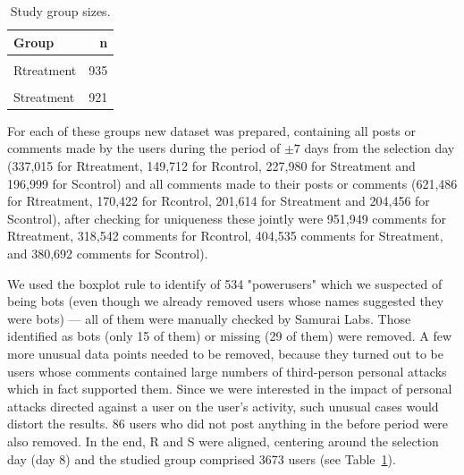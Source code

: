 \documentclass[a4paper,fleqn]{cas-dc}
\begin{document}
\begin{table}[H]

\centering\begingroup\fontsize{9}{11}\selectfont

\begin{tabular}{lr}
\toprule
Group & n\\
\midrule
\cellcolor{gray!6}{Rcontrol} & \cellcolor{gray!6}{875}\\
Rtreatment & 935\\
\cellcolor{gray!6}{Scontrol} & \cellcolor{gray!6}{942}\\
Streatment & 921\\
\bottomrule
\end{tabular}
\endgroup{}
\caption{Study group sizes.}
\label{tab:groups}
\end{table}






For each of these groups new  dataset was prepared, containing all posts or comments made by the users during the period of $\pm 7$ days from the selection day (337,015 for \textsf{Rtreatment}, 149,712 for \textsf{Rcontrol}, 227,980 for \textsf{Streatment} and 196,999 for \textsf{Scontrol}) and all comments made to their posts or comments (621,486 for \textsf{Rtreatment}, 170,422 for \textsf{Rcontrol}, 201,614 for \textsf{Streatment} and 204,456 for \textsf{Scontrol}), after checking for uniqueness these jointly were 951,949 comments for \textsf{Rtreatment}, 318,542 comments for \textsf{Rcontrol}, 404,535 comments for \textsf{Streatment}, and 380,692 comments for \textsf{Scontrol}).  







We used the boxplot rule to identify  of 534 "powerusers" which we suspected of being bots (even though we already removed users whose names suggested they were bots) --- all of them were manually checked by \textsf{Samurai Labs}. Those identified as bots (only 15 of them) or missing (29 of them) were removed.  A few more unusual data points needed to be removed, because they turned out to be users whose comments contained large numbers of third-person personal attacks which in fact supported them. Since we were interested in the impact of personal attacks directed against a user on the user's activity, such unusual cases would distort the results.   86 users who did not post anything in the \textsf{before} period were also removed.  In the end, \textsf{R} and \textsf{S} were aligned, centering around the selection day (day 8) and the studied group comprised 3673 users (see 
\mbox{Table \ref{tab:groups}}).
\end{document}
